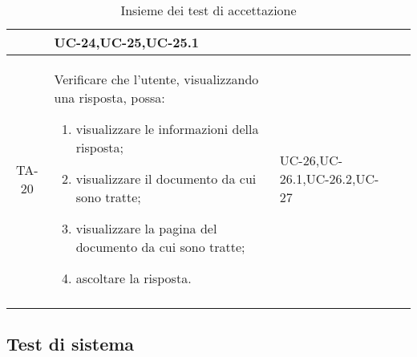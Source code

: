 \begin{xltabular}{\textwidth}{| c | X | X | c |}
\begin{enumerate}
    \end{enumerate}& UC-24,\newline UC-25,\newline UC-25.1 & \textcolor{xmarkcolor}{}  \\
    \hline
    
     TA-20 & Verificare che l'utente, visualizzando una risposta, possa:
    \begin{enumerate}
        \item visualizzare le informazioni della risposta;
        \item visualizzare il documento da cui sono tratte;
        \item visualizzare la pagina del documento da cui sono tratte;
        \item ascoltare la risposta.
        
    \end{enumerate}& UC-26,\newline UC-26.1,\newline UC-26.2,\newline UC-27 & \textcolor{xmarkcolor}{} \\
    \hline

     \caption{Insieme dei test di accettazione} 
    
\end{xltabular}
\endgroup


\subsection{Test di sistema}

